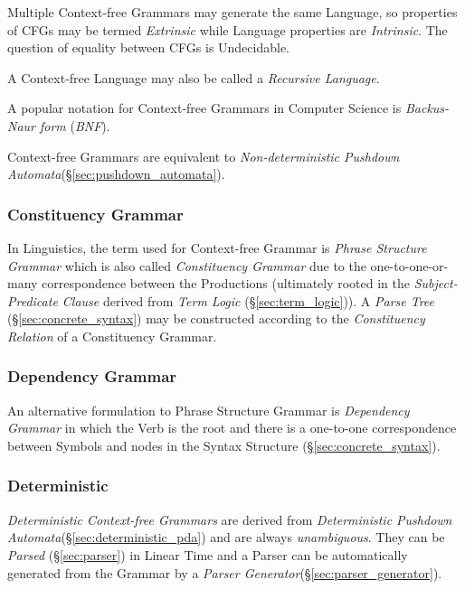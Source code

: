 Multiple Context-free Grammars may generate the same Language, so
properties of CFGs may be termed \emph{Extrinsic} while Language
properties are \emph{Intrinsic}. The question of equality between CFGs
is Undecidable.

A Context-free Language may also be called a \emph{Recursive
  Language}.

A popular notation for Context-free Grammars in Computer Science is
\emph{Backus-Naur form} (\emph{BNF}).

Context-free Grammars are equivalent to \emph{Non-deterministic
  Pushdown Automata}(\S\ref{sec:pushdown_automata}).



\subsubsection{Constituency Grammar}\label{sec:constituency_grammar}

In Linguistics, the term used for Context-free Grammar is \emph{Phrase
  Structure Grammar} which is also called \emph{Constituency Grammar}
due to the one-to-one-or-many correspondence between the Productions
(ultimately rooted in the \emph{Subject-Predicate Clause} derived from
\emph{Term Logic} (\S\ref{sec:term_logic})). A \emph{Parse Tree}
(\S\ref{sec:concrete_syntax}) may be constructed according to the
\emph{Constituency Relation} of a Constituency Grammar.



\subsubsection{Dependency Grammar}\label{sec:dependency_grammar}
An alternative formulation to Phrase Structure Grammar is
\emph{Dependency Grammar} in which the Verb is the root and there is a
one-to-one correspondence between Symbols and nodes in the Syntax
Structure (\S\ref{sec:concrete_syntax}).



\subsubsection{Deterministic}\label{sec:deterministic_cfg}
\emph{Deterministic Context-free Grammars} are derived from
\emph{Deterministic Pushdown
  Automata}(\S\ref{sec:deterministic_pda}) and are always
\emph{unambiguous}. They can be \emph{Parsed} (\S\ref{sec:parser}) in
Linear Time and a Parser can be automatically generated from
the Grammar by a \emph{Parser
  Generator}(\S\ref{sec:parser_generator}).



